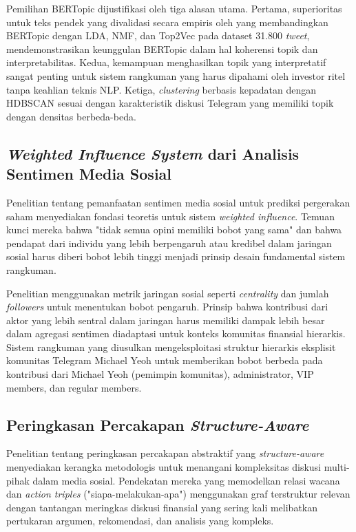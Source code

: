 Pemilihan BERTopic dijustifikasi oleh tiga alasan utama. Pertama, superioritas untuk teks pendek yang divalidasi secara empiris oleh \textcite{egger2022} yang membandingkan BERTopic dengan LDA, NMF, dan Top2Vec pada dataset 31.800 \textit{tweet}, mendemonstrasikan keunggulan BERTopic dalam hal koherensi topik dan interpretabilitas. Kedua, kemampuan menghasilkan topik yang interpretatif sangat penting untuk sistem rangkuman yang harus dipahami oleh investor ritel tanpa keahlian teknis NLP. Ketiga, \textit{clustering} berbasis kepadatan dengan HDBSCAN sesuai dengan karakteristik diskusi Telegram yang memiliki topik dengan densitas berbeda-beda.

\subsection{\textit{Weighted Influence System} dari Analisis Sentimen Media Sosial}

Penelitian \textcite{si2014} tentang pemanfaatan sentimen media sosial untuk prediksi pergerakan saham menyediakan fondasi teoretis untuk sistem \textit{weighted influence}. Temuan kunci mereka bahwa "tidak semua opini memiliki bobot yang sama" dan bahwa pendapat dari individu yang lebih berpengaruh atau kredibel dalam jaringan sosial harus diberi bobot lebih tinggi menjadi prinsip desain fundamental sistem rangkuman.

Penelitian \textcite{si2014} menggunakan metrik jaringan sosial seperti \textit{centrality} dan jumlah \textit{followers} untuk menentukan bobot pengaruh. Prinsip bahwa kontribusi dari aktor yang lebih sentral dalam jaringan harus memiliki dampak lebih besar dalam agregasi sentimen diadaptasi untuk konteks komunitas finansial hierarkis. Sistem rangkuman yang diusulkan mengeksploitasi struktur hierarkis eksplisit komunitas Telegram Michael Yeoh untuk memberikan bobot berbeda pada kontribusi dari Michael Yeoh (pemimpin komunitas), administrator, VIP members, dan regular members.

\subsection{Peringkasan Percakapan \textit{Structure-Aware}}

Penelitian \textcite{chen2021} tentang peringkasan percakapan abstraktif yang \textit{structure-aware} menyediakan kerangka metodologis untuk menangani kompleksitas diskusi multi-pihak dalam media sosial. Pendekatan mereka yang memodelkan relasi wacana dan \textit{action triples} ("siapa-melakukan-apa") menggunakan graf terstruktur relevan dengan tantangan meringkas diskusi finansial yang sering kali melibatkan pertukaran argumen, rekomendasi, dan analisis yang kompleks.


